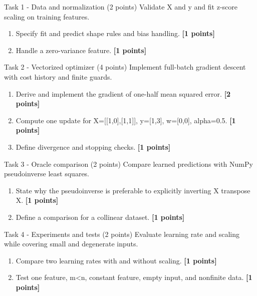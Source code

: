 \documentclass[aspectratio=169,11pt]{beamer}
\begin{document}
\begin{frame}{Task 1 - Data and normalization (2 points)}
\small
Validate X and y and fit z-score scaling on training features.

\vspace{0.2cm}
\begin{enumerate}
\item[\textbf{a.}] Specify fit and predict shape rules and bias handling. \hfill{\color{courseblue}\textbf{[1 points]}}
\item[\textbf{b.}] Handle a zero-variance feature. \hfill{\color{courseblue}\textbf{[1 points]}}
\end{enumerate}
\end{frame}

\begin{frame}{Task 2 - Vectorized optimizer (4 points)}
\small
Implement full-batch gradient descent with cost history and finite guards.

\vspace{0.2cm}
\begin{enumerate}
\item[\textbf{a.}] Derive and implement the gradient of one-half mean squared error. \hfill{\color{courseblue}\textbf{[2 points]}}
\item[\textbf{b.}] Compute one update for X=[[1,0],[1,1]], y=[1,3], w=[0,0], alpha=0.5. \hfill{\color{courseblue}\textbf{[1 points]}}
\item[\textbf{c.}] Define divergence and stopping checks. \hfill{\color{courseblue}\textbf{[1 points]}}
\end{enumerate}
\end{frame}

\begin{frame}{Task 3 - Oracle comparison (2 points)}
\small
Compare learned predictions with NumPy pseudoinverse least squares.

\vspace{0.2cm}
\begin{enumerate}
\item[\textbf{a.}] State why the pseudoinverse is preferable to explicitly inverting X transpose X. \hfill{\color{courseblue}\textbf{[1 points]}}
\item[\textbf{b.}] Define a comparison for a collinear dataset. \hfill{\color{courseblue}\textbf{[1 points]}}
\end{enumerate}
\end{frame}

\begin{frame}{Task 4 - Experiments and tests (2 points)}
\small
Evaluate learning rate and scaling while covering small and degenerate inputs.

\vspace{0.2cm}
\begin{enumerate}
\item[\textbf{a.}] Compare two learning rates with and without scaling. \hfill{\color{courseblue}\textbf{[1 points]}}
\item[\textbf{b.}] Test one feature, m<n, constant feature, empty input, and nonfinite data. \hfill{\color{courseblue}\textbf{[1 points]}}
\end{enumerate}
\end{frame}
\end{document}
